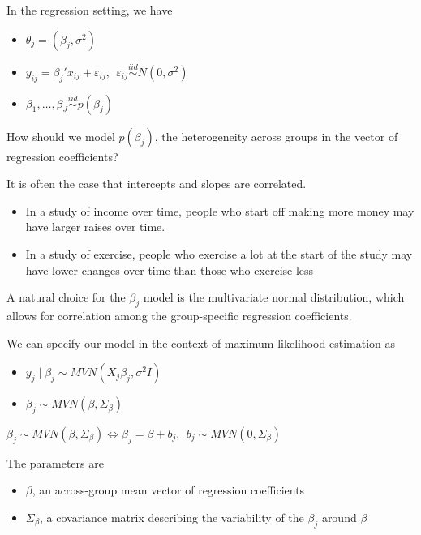\documentclass[ignorenonframetext,]{beamer}
\providecommand{\tightlist}{%
  \setlength{\itemsep}{0pt}\setlength{\parskip}{0pt}}
\begin{document}
\begin{frame}{}

In the regression setting, we have

\begin{itemize}
\tightlist
\item
  \(\theta_j=(\beta_j, \sigma^2)\)
\item
  \(y_{ij}=\beta_j'x_{ij}+\varepsilon_{ij}, ~~ \varepsilon_{ij} \overset{iid}{\sim} N\left(0,\sigma^2\right)\)
\item
  \(\beta_1, \ldots, \beta_J \overset{iid}{\sim} p(\beta_j)\)
\end{itemize}

How should we model \(p(\beta_j)\), the heterogeneity across groups in
the vector of regression coefficients?

\end{frame}

\begin{frame}{}

It is often the case that intercepts and slopes are correlated.

\begin{itemize}
\tightlist
\item
  In a study of income over time, people who start off making more money
  may have larger raises over time.
\item
  In a study of exercise, people who exercise a lot at the start of the
  study may have lower changes over time than those who exercise less
\end{itemize}

A natural choice for the \(\beta_j\) model is the multivariate normal
distribution, which allows for correlation among the group-specific
regression coefficients.

\end{frame}

\begin{frame}{}

We can specify our model in the context of maximum likelihood estimation
as

\begin{itemize}
\tightlist
\item
  \(y_j \mid \beta_j \sim MVN(X_j\beta_j, \sigma^2I)\)
\item
  \(\beta_j \sim MVN(\beta,\Sigma_\beta)\)
\end{itemize}

\(\beta_j \sim MVN(\beta,\Sigma_\beta) \iff \beta_j=\beta+b_j, ~~ b_j \sim MVN(0, \Sigma_\beta)\)

The parameters are

\begin{itemize}
\tightlist
\item
  \(\beta\), an across-group mean vector of regression coefficients
\item
  \(\Sigma_\beta\), a covariance matrix describing the variability of
  the \(\beta_j\) around \(\beta\)
\end{itemize}

\end{frame}
\end{document}
